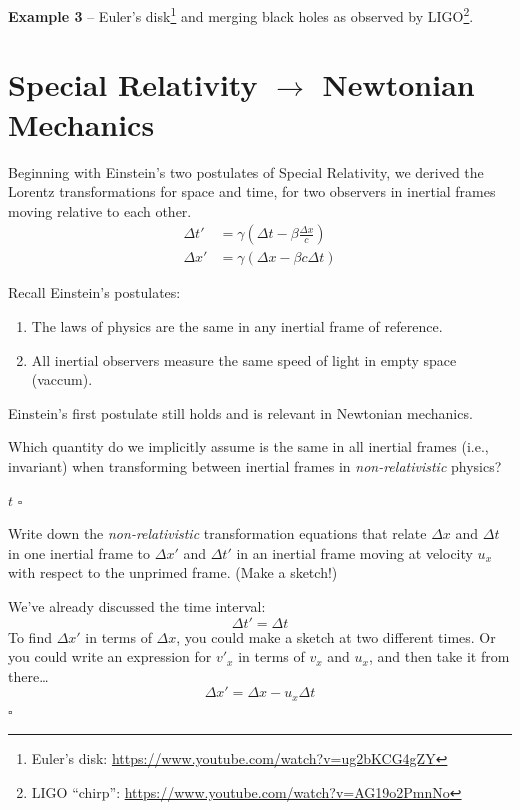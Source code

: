\documentclass[11pt, letterpaper, openany]{book}
\newenvironment{exercise}[1][Exercise]{%
  \tcolorbox[blanker, breakable, left=1em,
    before skip=1em, after skip=1em,
    borderline west={3pt}{0pt}{PhysNavy},
    colback=PhysCream,
    before upper={\textcolor{PhysNavy}{\sffamily\bfseries #1:}\space}
  ]%
}{%
  \endtcolorbox%
}
\newenvironment{solution}[1][Solution]{%
  \tcolorbox[blanker, breakable, left=1em,
    before skip=1em, after skip=1em,
    borderline west={2pt}{0pt}{PhysTeal},
    colback=PhysCream,
    before upper={\textcolor{PhysTeal}{\sffamily\bfseries #1.}\space}
  ]%
}{%
  \hfill\textcolor{PhysTeal}{\ensuremath{\square}}\endtcolorbox%
}
\begin{document}
\begin{itemize}
    \textbf{Example 3} -- Euler's disk\footnote{Euler's disk: \url{https://www.youtube.com/watch?v=ug2bKCG4gZY}} and merging black holes as observed by LIGO\footnote{LIGO ``chirp'': \url{https://www.youtube.com/watch?v=AG19o2PmnNo}}.
\end{itemize}

\section{Special Relativity $\to$ Newtonian Mechanics}

Beginning with Einstein's two postulates of Special Relativity, we derived the Lorentz transformations for space and time, for two observers in inertial frames moving relative to each other.
\begin{align*}
    \Delta t' &= \gamma \left( \Delta t - \beta \frac{\Delta x}{c} \right) \\
    \Delta x' &= \gamma ( \Delta x - \beta c \Delta t )
\end{align*}

Recall Einstein's postulates:
\begin{enumerate}
    \item The laws of physics are the same in any inertial frame of reference.
    \item All inertial observers measure the same speed of light in empty space (vaccum).
\end{enumerate}

Einstein's first postulate still holds and is relevant in Newtonian mechanics.

\begin{exercise}[Quick Exercise 1]
Which quantity do we implicitly assume is the same in all inertial frames (i.e., invariant) when transforming between inertial frames in \textit{non-relativistic} physics?
\end{exercise}
\begin{solution}
$t$
\end{solution}

\begin{exercise}[Exercise 2]
Write down the \textit{non-relativistic} transformation equations that relate $\Delta x$ and $\Delta t$ in one inertial frame to $\Delta x'$ and $\Delta t'$ in an inertial frame moving at velocity $u_x$ with respect to the unprimed frame. (Make a sketch!)
\end{exercise}
\begin{solution}
We've already discussed the time interval:
\[ \Delta t' = \Delta t \]
To find $\Delta x'$ in terms of $\Delta x$, you could make a sketch at two different times. Or you could write an expression for $v'_x$ in terms of $v_x$ and $u_x$, and then take it from there\dots
\[ \Delta x' = \Delta x - u_x \Delta t \]
\end{solution}
\end{document}
